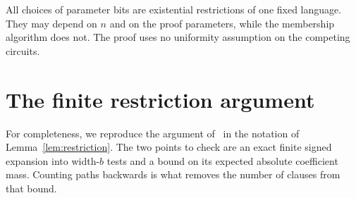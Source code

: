 \documentclass[11pt,letterpaper]{article}
\theoremstyle{definition}
\numberwithin{equation}{section}
\begin{document}
All choices of parameter bits are existential restrictions of one fixed
language. They may depend on $n$ and on the proof parameters, while the
membership algorithm does not. The proof uses no uniformity assumption
on the competing circuits.

\appendix
\section{The finite restriction argument}\label{app:restriction}
For completeness, we reproduce the argument of~\cite[Section~2]{OAI26}
in the notation of Lemma~\ref{lem:restriction}. The two points to check are
an exact finite signed expansion into width-$b$ tests and a bound on its
expected absolute coefficient mass. Counting paths backwards is what
removes the number of clauses from that bound.
\end{document}
